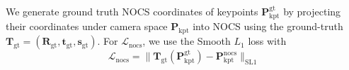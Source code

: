 We generate ground truth NOCS coordinates of keypoints $\mathbf{P}_{\text{kpt}}^{\text{gt}}$ by projecting their coordinates under camera space $\mathbf{P}_{\text{kpt}}$ into NOCS using the ground-truth \(\mathbf{T}_{\text{gt}} = \left( \mathbf{R}_{\text{gt}}, \mathbf{t}_{\text{gt}}, \mathbf{s}_{\text{gt}} \right)\). For $\mathcal{L}_{\text{nocs}}$, we use the Smooth $L_1$ loss with
\begin{equation}
\mathcal{L}_{\text{nocs}} = \| \mathbf{T}_{\text{gt}}(\mathbf{P}_{\text{kpt}}^{\text{gt}}) - \mathbf{P}_{\text{kpt}}^{\text{nocs}} \|_{\text{SL1}}
\end{equation}
